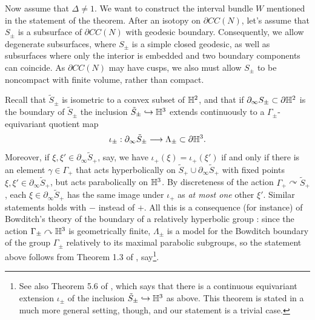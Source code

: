 \documentclass[12pt]{amsart}
\theoremstyle{definition}
\theoremstyle{remark}
\newcommand{\actson}{\curvearrowright}
\begin{document}

Now assume that $\Delta \neq 1$. We want to construct the interval bundle $W$ mentioned in the statement of the theorem. After an isotopy on $\partial CC(N)$, let's assume that $S_\pm$ is a subsurface of $\partial CC(N)$ with geodesic boundary. Consequently, we allow degenerate subsurfaces, where $S_\pm$ is a simple closed geodesic, as well as subsurfaces where only the interior is embedded and two boundary components can coincide. As $\partial CC(N)$ may have cusps, we also must allow $S_\pm$ to be noncompact with finite volume, rather than compact.


Recall that $\tilde S_\pm$ is isometric to a convex subset of $\mathbb H^2$, and that if $\partial_\infty S_\pm \subset \partial \mathbb H^2$ is the boundary of $\tilde S_\pm$ the inclusion $\tilde S_\pm \hookrightarrow \mathbb H^3$ extends continuously to a $\Gamma_\pm$-equivariant quotient map $$\iota_\pm : \partial_\infty \tilde S_\pm \longrightarrow \Lambda_\pm \subset  \partial \mathbb H^3.$$
Moreover, if $\xi,\xi' \in \partial_\infty \tilde S_+ $, say, we have $\iota_+(\xi)=\iota_+(\xi')$ if and only if there is an element $\gamma \in \Gamma_+$ that acts hyperbolically on $\tilde S_+ \cup \partial_\infty \tilde S_+$ with fixed points $\xi,\xi'\in \partial_\infty \tilde S_+$, but acts parabolically on $\mathbb H^3$. By discreteness of the action $\Gamma_+ \actson \tilde S_+$, each $\xi \in \partial_\infty \tilde S_+$ has the same image under $\iota_+$ as \emph{at most one} other $\xi'$. Similar statements holds with $-$ instead of $+$. All this is a consequence (for instance) of Bowditch's theory of the boundary of a relatively hyperbolic group \cite{bowditch2012relatively}: since the action $\Gamma_\pm \actson \BH^3$ is geometrically finite, $\Lambda_\pm$ is a model for the Bowditch boundary of the group $\Gamma_\pm$ relatively to its maximal parabolic subgroups, so the statement above follows from Theorem 1.3 of \cite{manning2015bowditch}, say\footnote{See also Theorem 5.6 of \cite{mj2017cannon}, which says that there  is a continuous equivariant extension $\iota_\pm$ of the inclusion $\tilde S_\pm \hookrightarrow \mathbb H^3$ as above. This theorem is stated in a much more general setting, though, and our statement is a trivial case.}.
\end{document}
